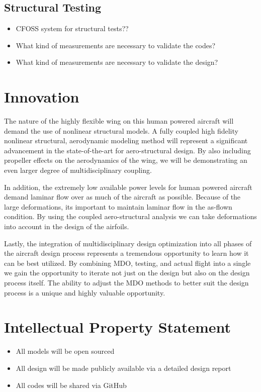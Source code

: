 \documentclass[]{aiaa-tc}
\begin{document}
    \subsection{Structural Testing}
        \begin{itemize}
            \item CFOSS system for structural tests?? 
            \item What kind of measurements are necessary to validate the codes? 
            \item What kind of measurements are necessary to validate the design? 
        \end{itemize}



  \section{Innovation}
    The nature of the highly flexible wing on this human powered aircraft will demand the use 
    of nonlinear structural models. A fully coupled high fidelity nonlinear structural, aerodynamic modeling method 
    will represent a significant advancement in the state­-of-­the-­art for aero­-structural design. By also including 
    propeller effects on the aerodynamics of the wing, we will be demonstrating an even larger degree of multidisciplinary 
    coupling. 

    In addition, the extremely low available power levels for human powered aircraft demand laminar flow over as much of 
    the aircraft as possible. Because of the large deformations, its important to maintain laminar flow in the 
    as-flown condition. By using the coupled aero-structural analysis we can take deformations into account in the design 
    of the airfoils. 

    Lastly, the integration of multidisciplinary design optimization into all phases of the aircraft design process represents
    a tremendous opportunity to learn how it can be best utilized. By combining MDO, testing, and actual flight into a single 
    we gain the opportunity to iterate not just on the design but also on the design process itself. The ability to adjust the 
    MDO methods to better suit the design process is a unique and highly valuable opportunity. 

  
\section{Intellectual Property Statement}
    \begin{itemize}
        \item All models will be open sourced
        \item All design will be made publicly available via a detailed design report
        \item All codes will be shared via GitHub
    \end{itemize}
\end{document}
